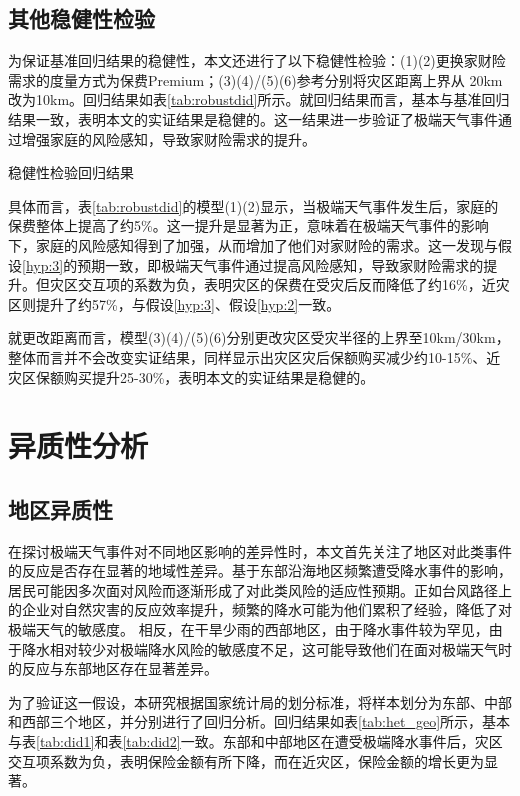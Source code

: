 \subsection{其他稳健性检验}

为保证基准回归结果的稳健性，本文还进行了以下稳健性检验：(1)(2)更换家财险需求的度量方式为保费Premium；(3)(4)/(5)(6)参考\citet{alok2020fund}分别将灾区距离上界从 20km 改为10km。回归结果如表\ref{tab:robustdid}所示。就回归结果而言，基本与基准回归结果一致，表明本文的实证结果是稳健的。这一结果进一步验证了极端天气事件通过增强家庭的风险感知，导致家财险需求的提升。
\begin{table}
    \centering
    \caption{稳健性检验回归结果}\label{tab:robustdid}
    
\end{table}

具体而言，表\ref{tab:robustdid}的模型(1)(2)显示，当极端天气事件发生后，家庭的保费整体上提高了约5\%。这一提升是显著为正，意味着在极端天气事件的影响下，家庭的风险感知得到了加强，从而增加了他们对家财险的需求。这一发现与假设\ref{hyp:3}的预期一致，即极端天气事件通过提高风险感知，导致家财险需求的提升。但灾区交互项的系数为负，表明灾区的保费在受灾后反而降低了约16\%，近灾区则提升了约57\%，与假设\ref{hyp:3}、假设\ref{hyp:2}一致。

就更改距离而言，模型(3)(4)/(5)(6)分别更改灾区受灾半径的上界至10km/30km，整体而言并不会改变实证结果，同样显示出灾区灾后保额购买减少约10-15\%、近灾区保额购买提升25-30\%，表明本文的实证结果是稳健的。

\section{异质性分析}
\subsection{地区异质性}
在探讨极端天气事件对不同地区影响的差异性时，本文首先关注了地区对此类事件的反应是否存在显著的地域性差异。基于东部沿海地区频繁遭受降水事件的影响，居民可能因多次面对风险而逐渐形成了对此类风险的适应性预期。正如台风路径上的企业对自然灾害的反应效率提升\citep{0Do}，频繁的降水可能为他们累积了经验，降低了对极端天气的敏感度\citep{陈思柳2021不同决策情境下的损失厌恶效应差异}。
相反，在干旱少雨的西部地区，由于降水事件较为罕见，由于降水相对较少对极端降水风险的敏感度不足，这可能导致他们在面对极端天气时的反应与东部地区存在显著差异。

为了验证这一假设，本研究根据国家统计局的划分标准，将样本划分为东部、中部和西部三个地区，并分别进行了回归分析。回归结果如表\ref{tab:het_geo}所示，基本与表\ref{tab:did1}和表\ref{tab:did2}一致。东部和中部地区在遭受极端降水事件后，灾区交互项系数为负，表明保险金额有所下降，而在近灾区，保险金额的增长更为显著。


